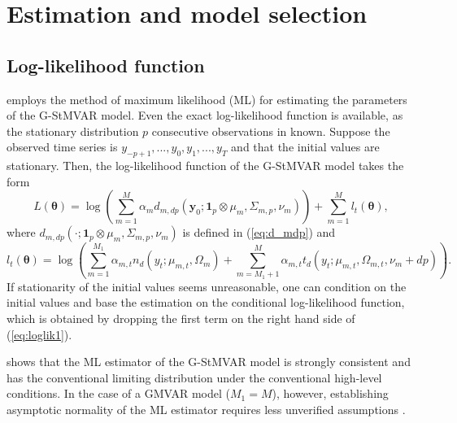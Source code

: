 \documentclass[nojss]{jss} %
\begin{document}
\section{Estimation and model selection}\label{sec:estimation}

\subsection{Log-likelihood function}\label{sec:loglik}
 employs the method of maximum likelihood (ML) for estimating the parameters of the G-StMVAR model. Even the exact log-likelihood function is available, as the stationary distribution $p$ consecutive observations in known. Suppose the observed time series is $y_{-p+1},...,y_0,y_1,...,y_T$ and that the initial values are stationary.  Then, the log-likelihood function of the G-StMVAR model takes the form
\begin{equation}\label{eq:loglik1}
L(\boldsymbol{\theta})=\log\left(\sum_{m=1}^M\alpha_m d_{m,dp}(\boldsymbol{y}_0;\boldsymbol{1}_p\otimes\mu_m,\Sigma_{m,p},\nu_m) \right) + \sum_{m=1}^M l_t(\boldsymbol{\theta}),
\end{equation}
where $d_{m,dp}(\cdot;\boldsymbol{1}_p\otimes\mu_m,\Sigma_{m,p},\nu_m)$ is defined in (\ref{eq:d_mdp}) and
\begin{equation}\label{eq:loglik2}
l_t(\boldsymbol{\theta}) = \log\left(\sum_{m=1}^{M_1}  \alpha_{m,t}n_d(y_t;\mu_{m,t},\Omega_{m})  + \sum_{m=M_1 + 1}^M  \alpha_{m,t}t_d(y_t;\mu_{m,t},\Omega_{m,t},\nu_m + dp  ) \right).
\end{equation}
If stationarity of the initial values seems unreasonable,  one can condition on the initial values and base the estimation on the conditional log-likelihood function, which is obtained by dropping the first term on the right hand side of (\ref{eq:loglik1}).

\citet[Theorem 3]{Virolainen2:2021} shows that the ML estimator of the G-StMVAR model is strongly consistent and has the conventional limiting distribution under the conventional high-level conditions. In the case of a GMVAR model ($M_1=M$), however, establishing asymptotic normality of the ML estimator requires less unverified assumptions \cite[Theorem 3]{Kalliovirta+Meitz+Saikkonen:2016}.
\end{document}

